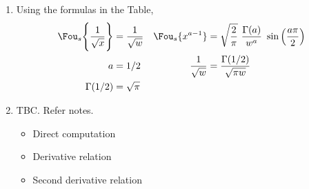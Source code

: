\begin{enumerate}
    \item Using the formulas in the Table,
          \begin{align}
              \Fou_s \Bigg\{ \frac{1}{\sqrt{x}} \Bigg\} & = \frac{1}{\sqrt{w}}   &
              \Fou_s \{x^{a-1}\}                        & = \sqrt{\frac{2}{\pi}}
              \ \frac{\Gamma(a)}{w^a}\ \sin\left( \frac{a\pi}{2} \right)           \\
              a                                         & = 1/2                  &
              \frac{1}{\sqrt{w}}                        & = \frac{\Gamma(1/2)}
              {\sqrt{\pi w}}                                                       \\
              \Gamma(1/2)                               & = \sqrt{\pi}
          \end{align}

    \item TBC. Refer notes.
          \begin{itemize}
              \item Direct computation
              \item Derivative relation
              \item Second derivative relation
          \end{itemize}
\end{enumerate}